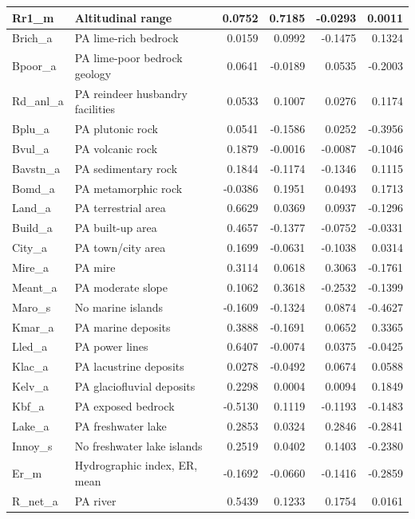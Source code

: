 \documentclass[]{article}
\begin{document}
\begin{table}[H]
\begin{tabular}{l|l|r|r|r|r}
\hline
Rr1\_m & Altitudinal range & 0.0752 & 0.7185 & -0.0293 & 0.0011\\
\hline
Brich\_a & PA lime-rich bedrock & 0.0159 & 0.0992 & -0.1475 & 0.1324\\
\hline
Bpoor\_a & PA lime-poor bedrock geology & 0.0641 & -0.0189 & 0.0535 & -0.2003\\
\hline
Rd\_anl\_a & PA reindeer husbandry facilities & 0.0533 & 0.1007 & 0.0276 & 0.1174\\
\hline
Bplu\_a & PA plutonic rock & 0.0541 & -0.1586 & 0.0252 & -0.3956\\
\hline
Bvul\_a & PA volcanic rock & 0.1879 & -0.0016 & -0.0087 & -0.1046\\
\hline
Bavstn\_a & PA sedimentary rock & 0.1844 & -0.1174 & -0.1346 & 0.1115\\
\hline
Bomd\_a & PA metamorphic rock & -0.0386 & 0.1951 & 0.0493 & 0.1713\\
\hline
Land\_a & PA terrestrial area & 0.6629 & 0.0369 & 0.0937 & -0.1296\\
\hline
Build\_a & PA built-up area & 0.4657 & -0.1377 & -0.0752 & -0.0331\\
\hline
City\_a & PA town/city area & 0.1699 & -0.0631 & -0.1038 & 0.0314\\
\hline
Mire\_a & PA mire & 0.3114 & 0.0618 & 0.3063 & -0.1761\\
\hline
Meant\_a & PA moderate slope & 0.1062 & 0.3618 & -0.2532 & -0.1399\\
\hline
Maro\_s & No marine islands & -0.1609 & -0.1324 & 0.0874 & -0.4627\\
\hline
Kmar\_a & PA marine deposits & 0.3888 & -0.1691 & 0.0652 & 0.3365\\
\hline
Lled\_a & PA power lines & 0.6407 & -0.0074 & 0.0375 & -0.0425\\
\hline
Klac\_a & PA lacustrine deposits & 0.0278 & -0.0492 & 0.0674 & 0.0588\\
\hline
Kelv\_a & PA glaciofluvial deposits & 0.2298 & 0.0004 & 0.0094 & 0.1849\\
\hline
Kbf\_a & PA exposed bedrock & -0.5130 & 0.1119 & -0.1193 & -0.1483\\
\hline
Lake\_a & PA freshwater lake & 0.2853 & 0.0324 & 0.2846 & -0.2841\\
\hline
Innoy\_s & No freshwater lake islands & 0.2519 & 0.0402 & 0.1403 & -0.2380\\
\hline
Er\_m & Hydrographic index, ER, mean & -0.1692 & -0.0660 & -0.1416 & -0.2859\\
\hline
R\_net\_a & PA river & 0.5439 & 0.1233 & 0.1754 & 0.0161\\

\end{tabular}
\end{table}
\end{document}
